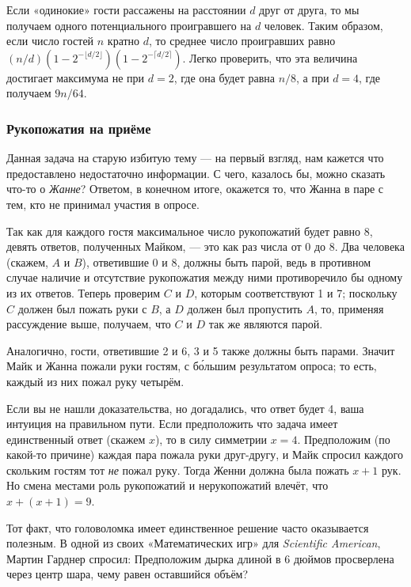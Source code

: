 Если «одинокие» гости рассажены на расстоянии $d$ друг от друга, то мы получаем одного потенциального проигравшего на $d$ человек.
Таким образом, если число гостей $n$ кратно $d$, то среднее число проигравших равно $(n/d)(1-2^{-\lfloor d/2\rfloor})(1-2^{-\lceil d/2\rceil})$.
Легко проверить, что эта величина достигает максимума не при $d=2$, где она будет равна $n/8$, а при $d=4$, где получаем $9n/64$.
\heart

\subsubsection*{Рукопожатия на приёме}%

Данная задача на старую избитую тему --- на первый взгляд, нам кажется что предоставлено недостаточно информации.
С чего, казалось бы, можно сказать что-то о \emph{Жанне}?
Ответом, в конечном итоге, окажется то, что Жанна в паре с тем, кто не принимал участия в опросе.

Так как для каждого гостя максимальное число рукопожатий будет равно 8, 
девять ответов, полученных Майком, --- это как раз числа от 0 до 8.
Два человека (скажем, $A$ и $B$), ответившие 0 и 8, должны быть парой, ведь в противном случае наличие и отсутствие рукопожатия между ними противоречило бы одному из их ответов.
Теперь проверим $C$ и $D$, которым соответствуют 1 и 7;
поскольку $C$ должен был пожать руки с $B$, а $D$ должен был пропустить $A$, то, применяя рассуждение выше, получаем, что $C$ и $D$ так же являются парой.

Аналогично, гости, ответившие 2 и 6, 3 и 5 также должны быть парами.
Значит Майк и Жанна пожали руки гостям, с б\'{о}льшим результатом опроса;
то есть, каждый из них пожал руку четырём.
\heart

Если вы не нашли доказательства, но догадались, что ответ будет 4, ваша интуиция на правильном пути.
Если предположить что задача имеет единственный ответ (скажем $x$), то в силу симметрии $x=4$.
Предположим (по какой-то причине) каждая пара пожала руки друг-другу, и Майк спросил каждого скольким гостям тот \emph{не} пожал руку.
Тогда Женни должна была пожать $x+1$ рук.
Но смена местами роль рукопожатий и нерукопожатий влечёт, что $x+(x+1)=9$.

Тот факт, что головоломка имеет единственное решение часто оказывается полезным.
В одной из своих «Математических игр» для \emph{Scientific American}, Мартин Гарднер спросил:
Предположим дырка длиной в 6 дюймов просверлена через центр шара, чему равен оставшийся объём?

